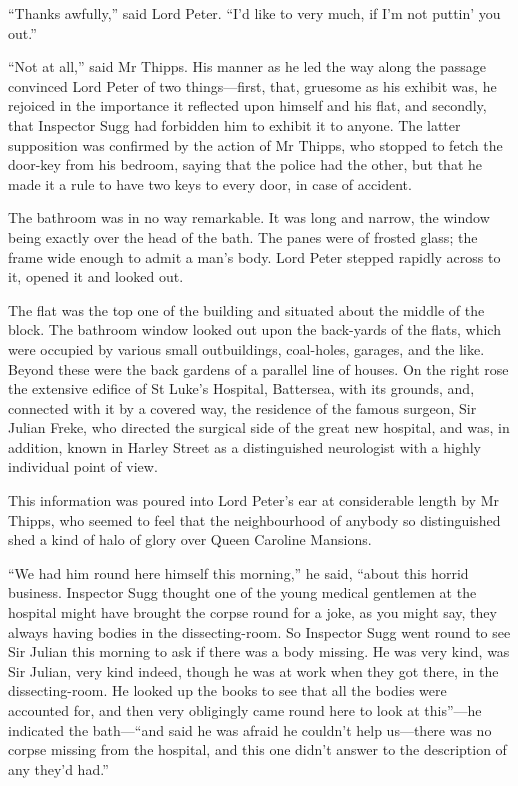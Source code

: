 \enquote{Thanks awfully,} said Lord Peter. \enquote{I’d like to very much, if I’m not puttin’ you out.}

\enquote{Not at all,} said Mr Thipps. His manner as he led the way along the passage convinced Lord Peter of two things\allowbreak---\allowbreak first, that, gruesome as his exhibit was, he rejoiced in the importance it reflected upon himself and his flat, and secondly, that Inspector Sugg had forbidden him to exhibit it to anyone. The latter supposition was confirmed by the action of Mr Thipps, who stopped to fetch the door-key from his bedroom, saying that the police had the other, but that he made it a rule to have two keys to every door, in case of accident.

The bathroom was in no way remarkable. It was long and narrow, the window being exactly over the head of the bath. The panes were of frosted glass; the frame wide enough to admit a man’s body. Lord Peter stepped rapidly across to it, opened it and looked out.

The flat was the top one of the building and situated about the middle of the block. The bathroom window looked out upon the back-yards of the flats, which were occupied by various small outbuildings, coal-holes, garages, and the like. Beyond these were the back gardens of a parallel line of houses. On the right rose the extensive edifice of St Luke’s Hospital, Battersea, with its grounds, and, connected with it by a covered way, the residence of the famous surgeon, Sir Julian Freke, who directed the surgical side of the great new hospital, and was, in addition, known in Harley Street as a distinguished neurologist with a highly individual point of view.

This information was poured into Lord Peter’s ear at considerable length by Mr Thipps, who seemed to feel that the neighbourhood of anybody so distinguished shed a kind of halo of glory over Queen Caroline Mansions.

\enquote{We had him round here himself this morning,} he said, \enquote{about this horrid business. Inspector Sugg thought one of the young medical gentlemen at the hospital might have brought the corpse round for a joke, as you might say, they always having bodies in the dissecting-room. So Inspector Sugg went round to see Sir Julian this morning to ask if there was a body missing. He was very kind, was Sir Julian, very kind indeed, though he was at work when they got there, in the dissecting-room. He looked up the books to see that all the bodies were accounted for, and then very obligingly came round here to look at this}---he indicated the bath---\enquote{and said he was afraid he couldn’t help us\allowbreak---\allowbreak there was no corpse missing from the hospital, and this one didn’t answer to the description of any they’d had.}

